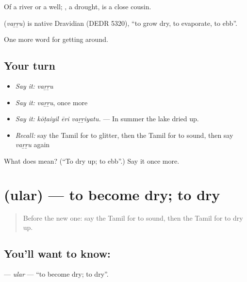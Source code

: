 Of a river or a well; , a drought, is a close cousin.

\begin{cousinweb}
\textbf{} (\emph{vaṟṟu}) is native Dravidian (DEDR 5320), \textquotedblleft{}to grow dry, to evaporate, to ebb\textquotedblright{}.
\end{cousinweb}

\begin{grammarlens}[title={What you've built}]
One more word for getting around.
\end{grammarlens}

\subsection*{Your turn}
\begin{itemize}
\raggedright
  \item \emph{Say it:} \emph{vaṟṟu}
  \item \emph{Say it:} \emph{vaṟṟu}, once more
  \item \emph{Say it:} \emph{kōṭaiyil ēri vaṟṟiyatu.} — In summer the lake dried up.
  \item \emph{Recall:} say the Tamil for to glitter, then the Tamil for to sound, then say \emph{vaṟṟu} again
\end{itemize}

\begin{tcolorbox}[breakable,colback=teal!4,colframe=teal!35!black,title={Before you move on}]
What does  mean? (\textquotedblleft{}To dry up; to ebb\textquotedblright{}.) Say it once more.
\end{tcolorbox}
\section[\texorpdfstring{\ta{உலர்} (ular)}{உலர் (ular)}]{ (ular) — to become dry; to dry}

\label{lesson:TA-C431-ular}



\begin{quote}
Before the new one: say the Tamil for to sound, then the Tamil for to dry up.
\end{quote}

\subsection*{You'll want to know: }
\textbf{} — \emph{ular} — \textquotedblleft{}to become dry; to dry\textquotedblright{}.

